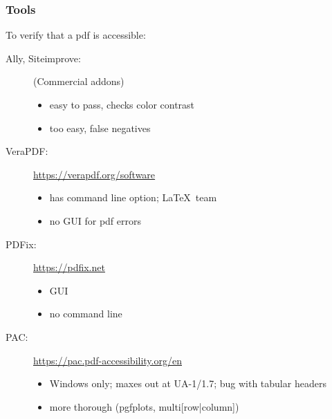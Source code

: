 \documentclass{ltx-talk}
\begin{document}
\begin{frame}
\frametitle{Tools}
To verify that a pdf is accessible:
\begin{description}
\item[Ally, Siteimprove:] (Commercial addons)
\begin{itemize}
\item[\emoji{thumbsup}] easy to pass, checks color contrast
\item[\emoji{thumbsdown}] too easy, false negatives
\end{itemize}
\item[VeraPDF:] \url{https://verapdf.org/software}
\begin{itemize}
\item[\emoji{thumbsup}] has command line option; \LaTeX\ team
\item[\emoji{thumbsdown}] no GUI for pdf errors
\end{itemize}
\item[PDFix:] \url{https://pdfix.net}
\begin{itemize}
\item[\emoji{thumbsup}] GUI
\item[\emoji{thumbsdown}] no command line
\end{itemize}
\item[PAC:] \url{https://pac.pdf-accessibility.org/en}
\begin{itemize}
\item[\emoji{thumbsdown}] Windows only; maxes out at UA-1/1.7; bug with tabular headers
\item[\emoji{thumbsup}\emoji{thumbsdown}] more thorough (pgfplots, multi[row|column])
\end{itemize}
\end{description}
\end{frame}
\end{document}
